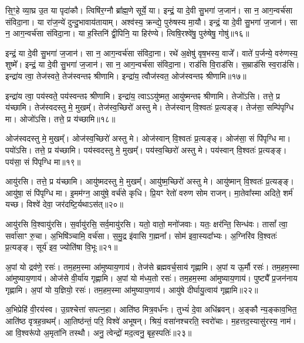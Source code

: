 सि॒ꣳ॒हे व्या॒घ्र उ॒त या पृदा॑कौ।
त्विषि॑र॒ग्नौ ब्रा᳚ह्म॒णे सूर्ये॒ या।
इन्द्रं॒ या दे॒वी सु॒भगा॑ ज॒जान॑।
सा न॒ आग॒न्वर्च॑सा संविदा॒ना।
या रा॑ज॒न्ये॑ दुन्दु॒भावाय॑तायाम्।
अश्व॑स्य॒ क्रन्द्ये॒ पुरु॑षस्य मा॒यौ।
इन्द्रं॒ या दे॒वी सु॒भगा॑ ज॒जान॑।
सा न॒ आग॒न्वर्च॑सा संविदा॒ना।
या ह॒स्तिनि॑ द्वी॒पिनि॒ या हिर॑ण्ये।
त्विषि॒रश्वे॑षु॒ पुरु॑षेषु॒ गोषु॑॥१६॥

इन्द्रं॒ या दे॒वी सु॒भगा॑ ज॒जान॑।
सा न॒ आग॒न्वर्च॑सा संविदा॒ना।
रथे॑ अ॒क्षेषु॑ वृष॒भस्य॒ वाजे᳚।
वाते॑ प॒र्जन्ये॒ वरु॑णस्य॒ शुष्मे᳚।
इन्द्रं॒ या दे॒वी सु॒भगा॑ ज॒जान॑।
सा न॒ आग॒न्वर्च॑सा संविदा॒ना।
राड॑सि वि॒राड॑सि।
स॒म्राड॑सि स्व॒राड॑सि।
इन्द्रा॑य त्वा॒ तेज॑स्वते॒ तेज॑स्वन्तꣴ श्रीणामि।
इन्द्रा॑य॒ त्वौज॑स्वत॒ ओज॑स्वन्तꣴ श्रीणामि॥१७॥

इन्द्रा॑य त्वा॒ पय॑स्वते॒ पय॑स्वन्तꣴ श्रीणामि।
इन्द्रा॑य॒ त्वा\-ऽऽयु॑ष्मत॒ आयु॑ष्मन्तꣴ श्रीणामि।
तेजो॑ऽसि।
तत्ते॒ प्र य॑च्छामि।
तेज॑स्वदस्तु मे॒ मुखम्᳚।
तेज॑स्व॒च्छिरो॑ अस्तु मे।
तेज॑स्वान् वि॒श्वतः॑ प्र॒त्यङ्ङ्।
तेज॑सा॒ सम्पि॑पृग्धि मा।
ओजो॑ऽसि।
तत्ते॒ प्र य॑च्छामि॥१८॥

ओज॑स्वदस्तु मे॒ मुखम्᳚।
ओज॑स्व॒च्छिरो॑ अस्तु मे।
ओज॑स्वान् वि॒श्वतः॑ प्र॒त्यङ्ङ्।
ओज॑सा॒ सं पि॑पृग्धि मा।
पयो॑ऽसि।
तत्ते॒ प्र य॑च्छामि।
पय॑स्वदस्तु मे॒ मुखम्᳚।
पय॑स्व॒च्छिरो॑ अस्तु मे।
पय॑स्वान् वि॒श्वतः॑ प्र॒त्यङ्ङ्।
पय॑सा॒ सं पि॑पृग्धि मा॥१९॥

आयु॑रसि।
तत्ते॒ प्र य॑च्छामि।
आयु॑ष्मदस्तु मे॒ मुखम्᳚।
आयु॑ष्म॒च्छिरो॑ अस्तु मे।
आयु॑ष्मान् वि॒श्वतः॑ प्र॒त्यङ्ङ्।
आयु॑षा॒ सं पि॑पृग्धि मा।
इ॒मम॑ग्न॒ आयु॑षे॒ वर्च॑से कृधि।
प्रि॒यꣳ रेतो॑ वरुण सोम राजन्।
मा॒तेवा᳚स्मा अदिते॒ शर्म॑ यच्छ।
विश्वे॑ देवा॒ जर॑दष्टि॒र्यथा\-ऽस॑त्॥२०॥

आयु॑रसि वि॒श्वायु॑रसि।
स॒र्वायु॑रसि॒ सर्व॒मायु॑रसि।
यतो॒ वातो॒ मनो॑जवाः।
यतः॒ क्षर॑न्ति॒ सिन्ध॑वः।
तासां᳚ त्वा॒ सर्वा॑साꣳ रु॒चा।
अ॒भिषि॑ञ्चामि॒ वर्च॑सा।
स॒मु॒द्र इ॑वासि ग॒ह्मना᳚।
सोम॑ इवा॒स्यदा᳚भ्यः।
अ॒ग्निरि॑व वि॒श्वतः॑ प्र॒त्यङ्ङ्।
सूर्य॑ इव॒ ज्योति॑षा वि॒भूः॥२१॥

अ॒पां यो द्रव॑णे॒ रसः॑।
तम॒हम॒स्मा आ॑मुष्याय॒णाय॑।
तेज॑से ब्रह्म\-वर्च॒साय॑ गृह्णामि।
अ॒पां य ऊ॒र्मौ रसः॑।
तम॒हम॒स्मा आ॑\-मुष्या\-य॒णाय॑।
ओज॑से वी॒र्या॑य गृह्णामि।
अ॒पां यो म॑ध्य॒तो रसः॑।
तम॒\-ह\-म॒स्मा आ॑मुष्याय॒णाय॑।
पुष्ट्यै᳚ प्र॒जन॑नाय गृह्णामि।
अ॒पां यो य॒ज्ञियो॒ रसः॑।
तम॒हम॒स्मा आ॑मुष्याय॒णाय॑।
आयु॑षे दीर्घायु॒त्वाय॑ गृह्णामि॥२२॥\anuvakamend[गोष्वोज॑स्वन्तꣴ श्रीणा॒म्योजो॑ऽसि॒ तत्ते॒ प्रय॑च्छामि॒ पय॑सा॒ सम्पि॑पृग्धि॒ माऽस॑द्वि॒भूर्य॒ज्ञियो॒ रसो॒ द्वे च॑]

अ॒भिप्रेहि॑ वी॒रय॑स्व।
उ॒ग्रश्चेत्ता॑ सपत्न॒हा।
आति॑ष्ठ मित्र॒वर्ध॑नः।
तुभ्यं॑ दे॒वा अधि॑ब्रवन्।
अ॒ङ्कौ न्य॒ङ्काव॒भित॒ आति॑ष्ठ वृत्रह॒न्रथम्᳚।
आ॒तिष्ठ॑न्तं॒ परि॒ विश्वे॑ अभूषन्।
श्रियं॒ वसा॑नश्चरति॒ स्वरो॑चाः।
म॒हत्तद॒स्यासु॑रस्य॒ नाम॑।
आ वि॒श्वरू॑पो अ॒मृता॑नि तस्थौ।
अनु॒ त्वेन्द्रो॑ मद॒त्वनु॒ बृह॒स्पतिः॑॥२३॥

